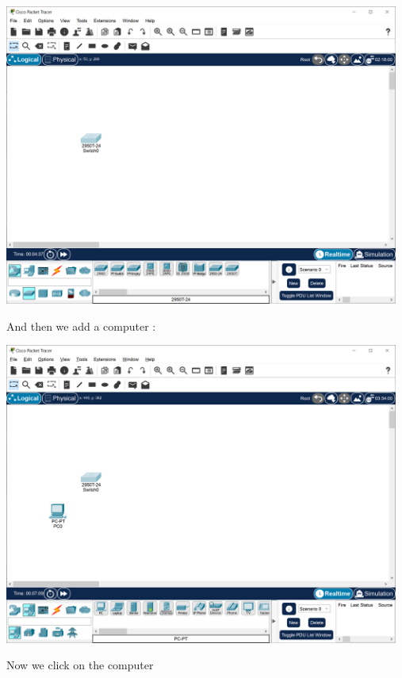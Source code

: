\documentclass[a4paper,12pt]{book}
\begin{document}
\noindent \includegraphics[width=13cm]{./step-by-step/1.PNG}
\clearpage

\noindent And then we add a computer : \newline

\noindent \includegraphics[width=13cm]{./step-by-step/2.PNG}
\clearpage

\noindent Now we click on the computer \newline
\end{document}
